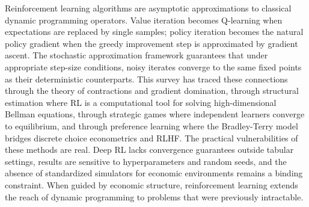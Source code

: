 Reinforcement learning algorithms are asymptotic approximations to classical dynamic programming operators. Value iteration becomes Q-learning when expectations are replaced by single samples; policy iteration becomes the natural policy gradient when the greedy improvement step is approximated by gradient ascent. The stochastic approximation framework guarantees that under appropriate step-size conditions, noisy iterates converge to the same fixed points as their deterministic counterparts. This survey has traced these connections through the theory of contractions and gradient domination, through structural estimation where RL is a computational tool for solving high-dimensional Bellman equations, through strategic games where independent learners converge to equilibrium, and through preference learning where the Bradley-Terry model bridges discrete choice econometrics and RLHF. The practical vulnerabilities of these methods are real. Deep RL lacks convergence guarantees outside tabular settings, results are sensitive to hyperparameters and random seeds, and the absence of standardized simulators for economic environments remains a binding constraint. When guided by economic structure, reinforcement learning extends the reach of dynamic programming to problems that were previously intractable.
